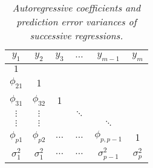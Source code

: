 \begin{table}[H]
\centering
\caption{\textit{Autoregressive coefficients and prediction error variances of successive regressions.}}
\begin{tabular}{cccccc}
 $y_{1}$&$y_{2}$ & $y_{3}$ & $\dots$ &$y_{m-1}$& $y_{m}$\\ \midrule
 $1$& &&&&\\
$\phi_{21}$& 1 &&&& \\
$\phi_{31}$& $\phi_{32}$& 1 &&& \\ 
$\vdots$ & $\vdots$ & & $\ddots$&& \\
$\vdots$ & $\vdots$ & && $\ddots$& \\
$\phi_{p1}$& $\phi_{p2}$&$\dots$ &$\dots$ &$\phi_{p,p-1}$ & 1\\ \midrule
$\sigma_1^2$ & $\sigma_1^2$ & $\dots$&$\dots$ &$\sigma_{p-1}^2$ &$\sigma_p^2$
\end{tabular} \label{table:cholesky-decomposition-successive-regressions}
\end{table}

